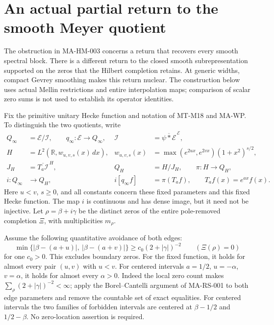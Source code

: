 \section{An actual partial return to the smooth Meyer quotient}
\label{sec:partial-return}

The obstruction in MA-HM-003 concerns a return that recovers
every smooth spectral block.  There is a different return to
the closed smooth subrepresentation supported on the zeros that
the Hilbert completion retains.  At generic widths, compact
Gevrey smoothing makes this return nuclear.  The construction
below uses actual Mellin restrictions and entire interpolation
maps; comparison of scalar zero sums is not used to establish
its operator identities.

Fix the primitive unitary Hecke function and notation of
MT-M18 and MA-WP.  To distinguish the two quotients, write
\[
\begin{aligned}
 Q_\infty&=\mathcal E/\mathcal I,\qquad q_\infty:\mathcal E\to Q_\infty,
       &\mathcal I&=\overline{\psi*\mathcal E}^{\,\mathcal E},\\
 H&=L^2(\mathbb R,w_{u,v,s}(x)\,dx),&
 w_{u,v,s}(x)&=\max(e^{2ux},e^{2vx})(1+x^2)^{s/2},\\
 J_H&=\overline{T_a\mathcal I}^{\,H},&
 Q_H&=H/J_H,\qquad \pi:H\to Q_H,\\
 i:Q_\infty&\longrightarrow Q_H,&
 i[q_\infty f]&=\pi(T_af),\qquad T_af(x)=e^{ax}f(x).
\end{aligned}
\tag{MA-PR.1}
\]
Here $u<v$, $s\ge0$, and all constants concern these fixed
parameters and this fixed Hecke function.  The map $i$ is
continuous and has dense image, but it need not be injective.
Let $\rho=\beta+i\gamma$ be the distinct zeros of the entire
pole-removed completion $\Xi$, with multiplicities $m_\rho$.

Assume the following quantitative avoidance of both edges:
\[
 \min\{|\beta-(a+u)|,\ |\beta-(a+v)|\}
       \ge c_0(2+|\gamma|)^{-2}
       \qquad(\Xi(\rho)=0)
\tag{MA-PR.2}
\]
for one $c_0>0$.  This excludes boundary zeros.
For the fixed function, it holds for almost every pair
$(u,v)$ with $u<v$.  For centered intervals
$a=1/2$, $u=-\alpha$, $v=\alpha$, it holds for almost every
$\alpha>0$.  Indeed the local zero count makes
$\sum_\rho(2+|\gamma|)^{-2}<\infty$; apply the
Borel--Cantelli argument of MA-RS-001 to both edge
parameters and remove the countable set of exact equalities.
For centered intervals the two families of forbidden intervals
are centered at $\beta-1/2$ and $1/2-\beta$.
No zero-location assertion is required.

